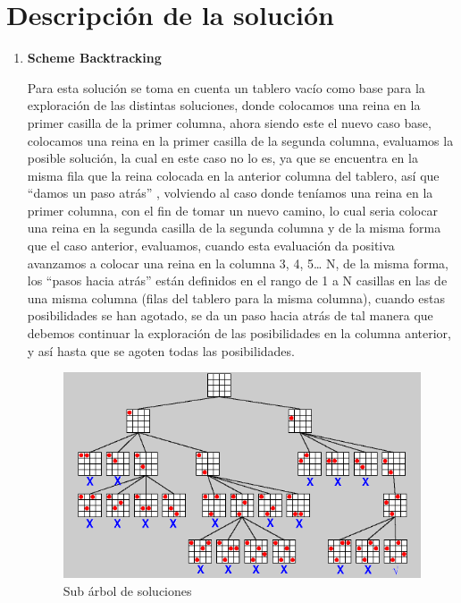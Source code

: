 \documentclass[12pt,a4paper]{article}
\begin{document}
\section{Descripción de la solución}
\begin{enumerate}
\item  \textbf{Scheme Backtracking}

Para esta solución se toma en cuenta un tablero vacío como base para la exploración de las distintas soluciones, donde colocamos una reina en la primer casilla de la primer columna, ahora siendo este el nuevo caso base, colocamos una reina en la primer casilla de la segunda columna, evaluamos la posible solución, la cual en este caso no lo es, ya que se encuentra en la misma fila que la reina colocada en la anterior columna del tablero, así que  “damos un paso atrás” , volviendo al caso donde teníamos una reina en la primer columna, con el fin de tomar un nuevo camino, lo cual seria colocar una reina en la segunda casilla de la segunda columna y de la misma forma que el caso anterior, evaluamos, cuando esta evaluación da positiva avanzamos a colocar una reina en la columna 3, 4, 5… N, de la misma forma, los “pasos hacia atrás”  están definidos en el rango de 1 a N casillas en las de una misma columna (filas del tablero para la misma columna), cuando estas posibilidades se han agotado, se da un paso hacia atrás de tal manera que debemos continuar la exploración de las posibilidades en la columna anterior, y así hasta que se agoten todas las posibilidades.

\begin{figure}[htp]
\centering
\graphicspath{ {imagenes/} }
\includegraphics[scale=0.50]{general.png}
\caption{Sub árbol de soluciones}
\label{foto}
\end{figure}


\end{enumerate}
\end{document}

